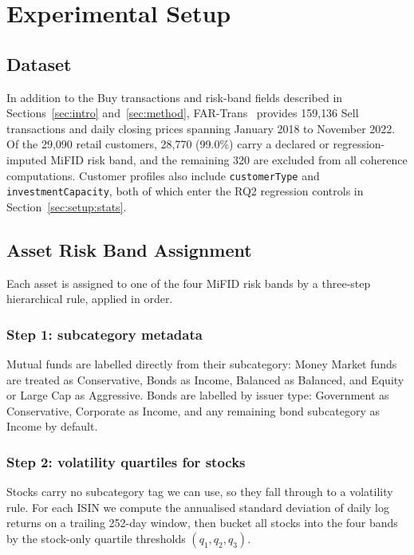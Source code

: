 \section{Experimental Setup}
\label{sec:setup}

\subsection{Dataset}
\label{sec:setup:dataset}

In addition to the Buy transactions and risk-band fields described in Sections~\ref{sec:intro} and~\ref{sec:method}, FAR-Trans~\cite{sanzcruzado2024fartransinvestmentdatasetfinancial} provides 159{,}136 Sell transactions and daily closing prices spanning January 2018 to November 2022. Of the 29{,}090 retail customers, 28{,}770 (99.0\%) carry a declared or regression-imputed MiFID risk band, and the remaining 320 are excluded from all coherence computations. Customer profiles also include \texttt{customerType} and \texttt{investmentCapacity}, both of which enter the RQ2 regression controls in Section~\ref{sec:setup:stats}.

\subsection{Asset Risk Band Assignment}
\label{sec:setup:bandassignment}

Each asset is assigned to one of the four MiFID risk bands by a three-step hierarchical rule, applied in order.

\subsubsection{Step 1: subcategory metadata} Mutual funds are labelled directly from their subcategory: Money Market funds are treated as Conservative, Bonds as Income, Balanced as Balanced, and Equity or Large Cap as Aggressive. Bonds are labelled by issuer type: Government as Conservative, Corporate as Income, and any remaining bond subcategory as Income by default.

\subsubsection{Step 2: volatility quartiles for stocks} Stocks carry no subcategory tag we can use, so they fall through to a volatility rule. For each ISIN we compute the annualised standard deviation of daily log returns on a trailing 252-day window, then bucket all stocks into the four bands by the stock-only quartile thresholds $(q_1, q_2, q_3)$.


